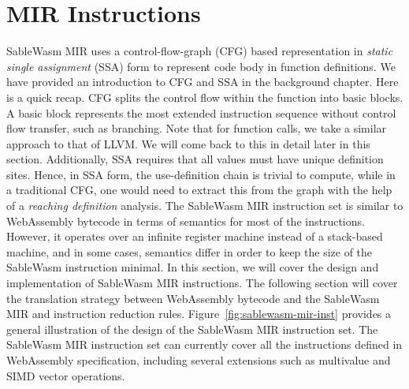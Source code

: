 \section{MIR Instructions}

SableWasm MIR uses a control-flow-graph (CFG) based representation in
\emph{static single assignment} (SSA) form to represent code body in function
definitions. We have provided an introduction to CFG and SSA in the background
chapter. Here is a quick recap. CFG splits the control flow within the function
into basic blocks. A basic block represents the most extended instruction
sequence without control flow transfer, such as branching. Note that for
function calls, we take a similar approach to that of LLVM. We will come back
to this in detail later in this section. Additionally, SSA requires that all
values must have unique definition sites. Hence, in SSA form, the
use-definition chain is trivial to compute, while in a traditional CFG, one
would need to extract this from the graph with the help of a \emph{reaching
  definition} analysis. The SableWasm MIR instruction set is similar to
WebAssembly bytecode in terms of semantics for most of the instructions.
However, it operates over an infinite register machine instead of a
stack-based machine, and in some cases, semantics differ in order to keep the
size of the SableWasm instruction minimal. In this section, we will cover the
design and implementation of SableWasm MIR instructions. The following section
will cover the translation strategy between WebAssembly bytecode and the
SableWasm MIR and instruction reduction rules.
Figure~\ref{fig:sablewasm-mir-inst} provides a general illustration of the
design of the SableWasm MIR instruction set. The SableWasm MIR instruction set
can currently cover all the instructions defined in WebAssembly specification,
including several extensions such as multivalue and SIMD vector operations.

